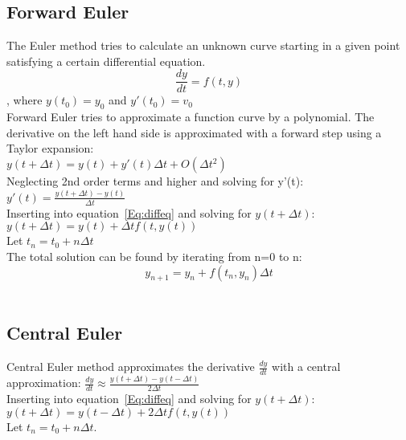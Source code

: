 \subsection{Forward Euler}
The Euler method tries to calculate an unknown curve starting in a given point satisfying a certain differential equation.\\
\begin{equation}
\frac{dy}{dt}=f(t,y)
\label{Eq:diffeq}
\end{equation}
, where $y(t_0)=y_0$ and $y'(t_0) = v_0$\\


Forward Euler tries to approximate a function curve by a polynomial. The derivative on the left hand side is approximated with a forward step using a Taylor expansion:\\
$y(t+\Delta t) = y(t) + y'(t)\Delta t + O(\Delta t^2)$\\
Neglecting 2nd order terms and higher and solving for y'(t):\\
$y'(t) = \frac{y(t+\Delta t)-y(t)}{\Delta t}$\\
Inserting into equation~\ref{Eq:diffeq} and solving for $y(t+\Delta t)$:\\
$y(t+\Delta t) = y(t)+\Delta t f(t,y(t))$\\


Let $t_n = t_0+n\Delta t$\\


The total solution can be found by iterating from n=0 to n:\\
\begin{equation}
y_{n+1} = y_n+f(t_n, y_n)\Delta t
\label{Eq:Forward_Euler}
\end{equation}\\

\subsection{Central Euler}
Central Euler method approximates the derivative $\frac{dy}{dt}$ with a central approximation:
$\frac{dy}{dt} \approx \frac{y(t+\Delta t) -y(t-\Delta t)}{2\Delta t}$\\

Inserting into equation~\ref{Eq:diffeq} and solving for $y(t+\Delta t)$:\\

$y(t+\Delta t) = y(t-\Delta t)+2\Delta t f(t,y(t))$\\


Let $t_n = t_0+n\Delta t$.\\


